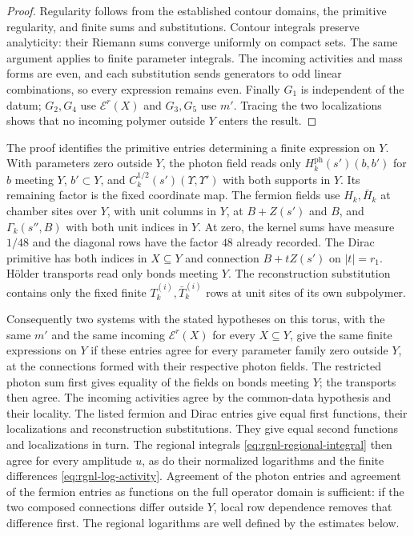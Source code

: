 \begin{proof}
Regularity follows from the established contour domains,
the primitive regularity, and finite sums and substitutions.
Contour integrals preserve analyticity: their Riemann sums
converge uniformly on compact sets. The same argument
applies to finite parameter integrals. The incoming
activities and mass forms are even, and each substitution
sends generators to odd linear combinations, so every
expression remains even.
Finally $G_1$ is independent of the datum; $G_2,G_4$
use $\mathscr E^r(X)$ and $G_3,G_5$ use $m'$.
Tracing the two localizations shows that no incoming
polymer outside $Y$ enters the result.
\end{proof}

The proof identifies the primitive entries determining a
finite expression on $Y$. With parameters zero outside $Y$,
the photon field reads only
$H_k^{\mathrm{ph}}(s')(b,b')$ for $b$ meeting $Y$,
$b'\subset Y$, and
$C_k^{1/2}(s')(\Upsilon,\Upsilon')$ with both supports
in $Y$. Its remaining factor is the fixed coordinate map.
The fermion fields use $H_k,\bar H_k$ at chamber sites
over $Y$, with unit columns in $Y$, at $B+Z(s')$ and
$B$, and $\Gamma_k(s'',B)$ with both unit indices in $Y$.
At zero, the kernel sums have measure $1/48$ and the
diagonal rows have the factor $48$ already recorded.
The Dirac primitive has both indices in $X\subseteq Y$
and connection $B+tZ(s')$ on $|t|=r_1$.
H\"older transports read only bonds meeting $Y$.
The reconstruction substitution contains only the fixed
finite $T_k^{(i)},\bar T_k^{(i)}$ rows at unit sites of its
own subpolymer.

Consequently two systems with the stated hypotheses on this torus,
with the same $m'$ and the same incoming $\mathscr E^r(X)$
for every $X\subseteq Y$, give the same finite expressions on $Y$
if these entries agree
for every parameter family zero outside $Y$, at the
connections formed with their respective photon fields.
The restricted photon sum first gives equality of the
fields on bonds meeting $Y$; the transports then agree. The
incoming activities agree by the common-data hypothesis and
their locality.
The listed fermion and Dirac entries give equal first
functions, their localizations and reconstruction
substitutions. They give equal second functions and
localizations in turn. The regional integrals
\eqref{eq:rgnl-regional-integral} then agree for every amplitude $u$,
as do their normalized logarithms and the finite differences
\eqref{eq:rgnl-log-activity}.
Agreement of the photon
entries and agreement of the fermion entries as functions
on the full operator domain is sufficient: if the two
composed connections differ outside $Y$, local row
dependence removes that difference first.
The regional logarithms are well defined by the estimates below.

